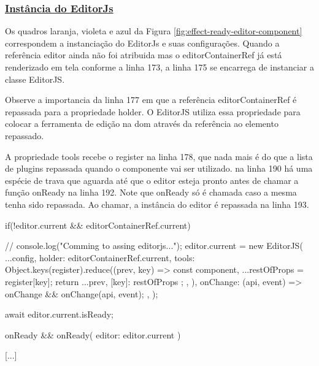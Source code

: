 \begin{Code6670227b7a1142fba718e5e710c89f7d}
[...]
    return <Context.Provider value={{
        editor: editor.current
    }}>
        <div style={{ display: 'none' }}>
            { pluginsRender }
            { inlinePluginsRender }
        </div>
        <div ref={ editorContainerRef } ></div>
    </Context.Provider>
}
\end{Code6670227b7a1142fba718e5e710c89f7d}

\subsubsection{\underline{Instância do EditorJs}}

Os quadros laranja, violeta e azul da
Figura \ref{fig:effect-ready-editor-component}
correspondem a instanciação do EditorJs e suas configurações.
Quando a referência editor ainda não foi atribuida mas o editorContainerRef
já está renderizado em tela conforme a linha 173, a linha 175 se encarrega
de instanciar a classe EditorJS.

Observe a importancia da linha 177 em que a referência editorContainerRef
é repassada para a propriedade holder. O EditorJS utiliza essa propriedade para
colocar a ferramenta de edição na
\acrshort{dom}
através da referência ao elemento repassado.

A propriedade tools recebe o register na linha 178, que nada mais é do que a lista
de plugins repassada quando o componente vai ser utilizado.
na linha 190 há uma espécie de trava que aguarda até que o editor esteja pronto
antes de chamar a função onReady na linha 192. Note que onReady só é chamada caso
a mesma tenha sido repassada. Ao chamar, a instância do editor é repassada na linha
193.

\begin{Code46b18dabc8634526a889fb90ac963f96}
[...]
if(!editor.current && editorContainerRef.current){
    // console.log("Comming to assing editorjs...");
    editor.current = new EditorJS({
        ...config,
        holder: editorContainerRef.current,
        tools: Object.keys(register).reduce((prev, key) => {
            const { component, ...restOfProps } = register[key];
            return {
                ...prev,
                [key]: restOfProps
            };
        }, {}),
        onChange: (api, event) => {
            onChange && onChange(api, event);
        },
    });

    await editor.current.isReady;

    onReady && onReady({
        editor: editor.current
    })
}
[...]
\end{Code46b18dabc8634526a889fb90ac963f96}

